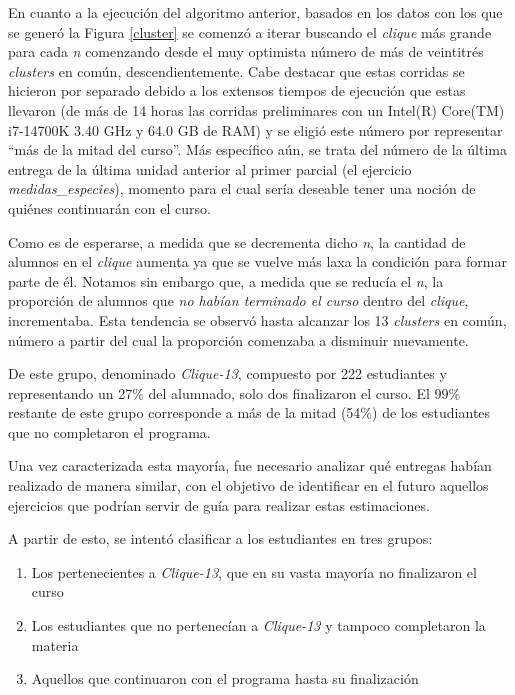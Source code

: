 \documentclass[11pt,a4paper,twoside,openany]{tesis}
\begin{document}
En cuanto a la ejecución del algoritmo anterior, basados en los datos con los que se generó la Figura \ref{cluster} se comenzó a iterar buscando el \emph{clique} más grande para cada \emph{n} comenzando desde el muy optimista número de más de veintitrés \emph{clusters} en común, descendientemente. Cabe destacar que estas corridas se hicieron por separado debido a los extensos tiempos de ejecución que estas llevaron (de más de 14 horas las corridas preliminares con un Intel(R) Core(TM) i7-14700K   3.40 GHz y 64.0 GB de RAM) y se eligió este número por representar ``más de la mitad del curso''. Más específico aún, se trata del número de la última entrega de la última unidad anterior al primer parcial (el ejercicio \emph{medidas\_especies}), momento para el cual sería deseable tener una noción de quiénes continuarán con el curso.   

Como es de esperarse, a medida que se decrementa dicho \emph{n}, la cantidad de alumnos en el \emph{clique} aumenta ya que se vuelve más laxa la condición para formar parte de él. Notamos sin embargo que, a medida que se reducía el \emph{n}, la proporción de alumnos que \emph{no habían terminado el curso} dentro del \emph{clique}, incrementaba.  Esta tendencia se observó hasta alcanzar los 13 \emph{clusters} en común, número a partir del cual la proporción comenzaba a disminuir nuevamente.

De este grupo, denominado \emph{Clique-13}, compuesto por 222 estudiantes y representando un 27\% del alumnado, solo dos finalizaron el curso. El 99\% restante de este grupo corresponde a más de la mitad (54\%) de los estudiantes que no completaron el programa.

Una vez caracterizada esta mayoría, fue necesario analizar qué entregas habían realizado de manera similar, con el objetivo de identificar en el futuro aquellos ejercicios que podrían servir de guía para realizar estas estimaciones.

A partir de esto, se intentó clasificar a los estudiantes en tres grupos:

\begin{enumerate}
    \item Los pertenecientes a \emph{Clique-13}, que en su vasta mayoría no finalizaron el curso
    \item Los estudiantes que no pertenecían a \emph{Clique-13} y tampoco completaron la materia
    \item Aquellos que continuaron con el programa hasta su finalización
\end{enumerate}
\end{document}
